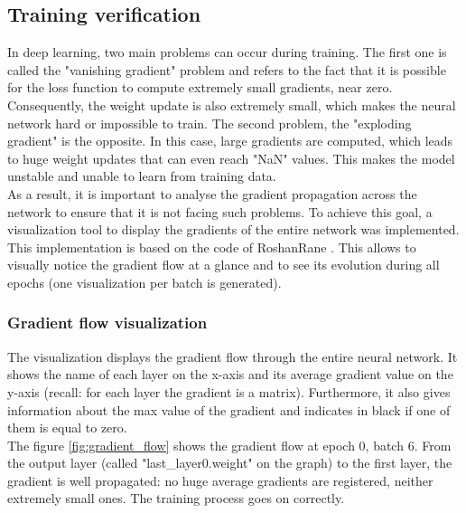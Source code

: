 \subsection{Training verification}
\setlength{\marginparwidth}{3cm}\leavevmode {}In deep learning, two main problems can occur during training. The first one is called the "vanishing gradient" problem and refers to the fact that it is possible for the loss function to compute extremely small gradients, near zero. Consequently, the weight update is also extremely small, which makes the neural network hard or impossible to train. The second problem, the "exploding gradient" is the opposite. In this case, large gradients are computed, which leads to huge weight updates that can even reach "NaN" values. This makes the model unstable and unable to learn from training data.  \\
As a result, it is important to analyse the gradient propagation across the network to ensure that it is not facing such problems. To achieve this goal, a visualization tool to display the gradients of the entire network was implemented. This implementation is based on the code of RoshanRane \cite{47}.  This allows to visually notice the gradient flow at a glance and to see its evolution during all epochs (one visualization per batch is generated).


\subsubsection{Gradient flow visualization}
The visualization displays the gradient flow through the entire neural network. It shows the name of each layer on the x-axis and its average gradient value on the y-axis (recall: for each layer the gradient is a matrix). Furthermore, it also gives information about the max value of the gradient and indicates in black if one of them is equal to zero.\\
The figure \ref{fig:gradient_flow} shows the gradient flow at epoch 0, batch 6. From the output layer (called "last\_layer0.weight" on the graph) to the first layer, the gradient is well propagated: no huge average gradients are registered, neither extremely small ones. The training process goes on correctly.

